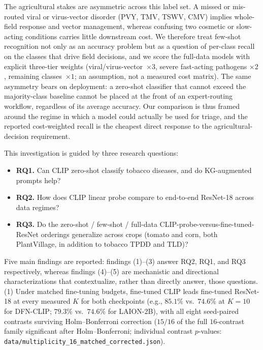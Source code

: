 \documentclass[10pt,a4paper]{article}
\begin{document}
The agricultural stakes are asymmetric across this label set. A missed or mis-routed viral or virus-vector disorder (PVY, TMV, TSWV, CMV) implies whole-field response and vector management, whereas confusing two cosmetic or slow-acting conditions carries little downstream cost. We therefore treat few-shot recognition not only as an accuracy problem but as a question of per-class recall on the classes that drive field decisions, and we score the full-data models with explicit three-tier weights (viral/virus-vector~$\times3$, severe fast-acting pathogens $\times2$, remaining classes~$\times1$; an assumption, not a measured cost matrix). The same asymmetry bears on deployment: a zero-shot classifier that cannot exceed the majority-class baseline cannot be placed at the front of an expert-routing workflow, regardless of its average accuracy. Our comparison is thus framed around the regime in which a model could actually be used for triage, and the reported cost-weighted recall is the cheapest direct response to the agricultural-decision requirement.

This investigation is guided by three research questions:

\begin{itemize}
    \item \textbf{RQ1.} Can CLIP zero-shot classify tobacco diseases, and do KG-augmented prompts help?
    \item \textbf{RQ2.} How does CLIP linear probe compare to end-to-end ResNet-18 across data regimes?
    \item \textbf{RQ3.} Do the zero-shot / few-shot / full-data CLIP-probe-versus-fine-tuned-ResNet orderings generalize across crops (tomato and corn, both PlantVillage, in addition to tobacco TPDD and TLD)?
\end{itemize}

Five main findings are reported: findings (1)--(3) answer RQ2, RQ1, and RQ3 respectively, whereas findings (4)--(5) are mechanistic and directional characterizations that contextualize, rather than directly answer, those questions.
(1) Under matched fine-tuning budgets, fine-tuned CLIP leads fine-tuned ResNet-18 at every measured $K$ for both checkpoints (e.g., $85.1\%$ vs.\ $74.6\%$ at $K{=}10$ for DFN-CLIP; $79.3\%$ vs.\ $74.6\%$ for LAION-2B), with all eight seed-paired contrasts surviving Holm--Bonferroni correction ($15/16$ of the full $16$-contrast family significant after Holm--Bonferroni; individual contrast $p$-values: \texttt{data/multiplicity\_16\_matched\_corrected.json}).
\end{document}
